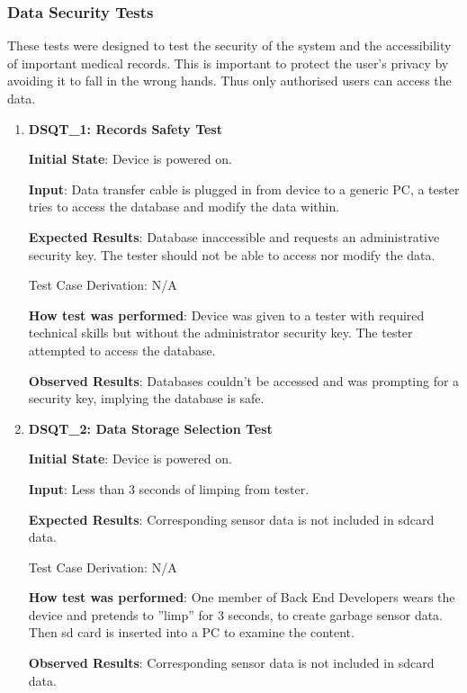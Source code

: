 \documentclass[12pt, titlepage]{article}
\begin{document}
\subsubsection{Data Security Tests}

These tests were designed to test the security of the system and the accessibility of important medical records. This is important to protect the user's privacy by avoiding it to fall in the wrong hands. Thus only authorised users can access the data.

\begin{enumerate}

  \item{\textbf{DSQT\_1: Records Safety Test}}\label{DSQT1}

  \textbf{Initial State}: Device is powered on.

  \textbf{Input}: Data transfer cable is plugged in from device to a generic PC, a tester tries to access the database and modify the data within.

  \textbf{Expected Results}: Database inaccessible and requests an administrative security key. The tester should not be able to access nor modify the data.

  Test Case Derivation: N/A

  \textbf{How test was performed}: Device was given to a tester with required technical skills but without the administrator security key. The tester attempted to access the database.

  \textbf{Observed Results}: Databases couldn't be accessed and was prompting for a security key, implying the database is safe.

  \item{\textbf{DSQT\_2: Data Storage Selection Test}}\label{DSQT2}

  \textbf{Initial State}: Device is powered on.

  \textbf{Input}: Less than 3 seconds of limping from tester.

  \textbf{Expected Results}: Corresponding sensor data is not included in sdcard data.

  Test Case Derivation: N/A

  \textbf{How test was performed}: One member of Back End Developers wears the device and pretends to ”limp” for 3 seconds, to create garbage sensor data. Then sd card is inserted into a PC to examine the content.

  \textbf{Observed Results}: Corresponding sensor data is not included in sdcard data.

\end{enumerate}
\end{document}
